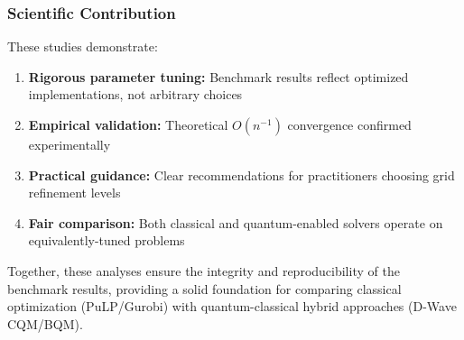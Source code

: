 \documentclass{article}
\begin{document}
\subsubsection{Scientific Contribution}

These studies demonstrate:

\begin{enumerate}
    \item \textbf{Rigorous parameter tuning:} Benchmark results reflect optimized implementations, not arbitrary choices
    \item \textbf{Empirical validation:} Theoretical $O(n^{-1})$ convergence confirmed experimentally
    \item \textbf{Practical guidance:} Clear recommendations for practitioners choosing grid refinement levels
    \item \textbf{Fair comparison:} Both classical and quantum-enabled solvers operate on equivalently-tuned problems
\end{enumerate}

Together, these analyses ensure the integrity and reproducibility of the benchmark results, providing a solid foundation for comparing classical optimization (PuLP/Gurobi) with quantum-classical hybrid approaches (D-Wave CQM/BQM).
\end{document}
